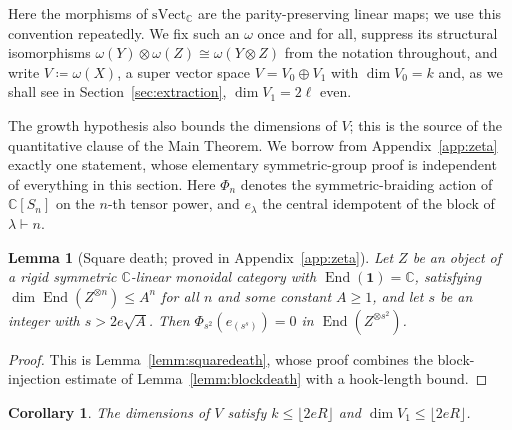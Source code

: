 \documentclass[11pt]{article}
\newtheorem{lemm}[theo]{Lemma}
\newtheorem{coro}[theo]{Corollary}
\newcommand{\unitobj}{\mathbf{1}}                 %
\newcommand{\genX}{X}                             %
\newcommand{\End}{\operatorname{End}}
\newcommand{\fib}{\omega}                         %
\newcommand{\svect}{\mathrm{sVect}_{\mathbb{C}}}
\begin{document}
Here the morphisms of $\svect$ are the parity-preserving linear
maps; we use this convention repeatedly. We fix such an $\fib$ once
and for all, suppress its structural isomorphisms
$\fib(Y)\otimes\fib(Z)\cong\fib(Y\otimes Z)$ from the notation
throughout, and write $V\coloneqq\fib(\genX)$, a super vector
space
$V=V_{0}\oplus V_{1}$ with $\dim V_{0}=k$ and, as we shall see in
Section~\ref{sec:extraction}, $\dim V_{1}=2\ell$ even.

The growth hypothesis also bounds the dimensions of $V$; this is
the source of the quantitative clause of the Main Theorem. We
borrow from Appendix~\ref{app:zeta} exactly one statement, whose
elementary symmetric-group proof is independent of everything in
this section. Here $\Phi_{n}$ denotes the symmetric-braiding
action of $\mathbb{C}[S_{n}]$ on the $n$-th tensor power, and
$e_{\lambda}$ the central idempotent of the block of
$\lambda\vdash n$.

\begin{lemm}[Square death; proved in
Appendix~\ref{app:zeta}]\label{lemm:squareimport}
Let $Z$ be an object of a rigid symmetric $\mathbb{C}$-linear
monoidal category with $\End(\unitobj)=\mathbb{C}$, satisfying
$\dim\End(Z^{\otimes n})\le A^{n}$ for all $n$ and some constant
$A\ge1$, and let $s$ be an integer with $s>2e\sqrt{A}$. Then
$\Phi_{s^{2}}(e_{(s^{s})})=0$ in $\End(Z^{\otimes s^{2}})$.
\end{lemm}

\begin{proof}
This is Lemma~\ref{lemm:squaredeath}, whose proof combines the
block-injection estimate of Lemma~\ref{lemm:blockdeath} with a
hook-length bound.
\end{proof}

\begin{coro}\label{coro:dimbound}
The dimensions of $V$ satisfy $k\le\lfloor 2eR\rfloor$ and
$\dim V_{1}\le\lfloor 2eR\rfloor$.
\end{coro}
\end{document}
